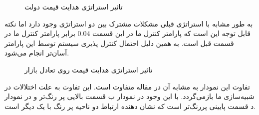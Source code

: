 \documentclass[13pt,onecolumn,a4paper]{article}
\begin{document}
\begin{figure}[H]
	\centering
	\hfil
	
	\medskip
	\hfil
	
	\caption{تاثیر استراتژی هدایت قیمت دولت}
	\label{fig:myfigure}
\end{figure}
به طور مشابه با استراتژی قبلی مشکلات مشترک بین دو استراتژی وجود دارد اما نکته قابل توجه این است که پارامتر کنترل ما در این قسمت $0.04$ برابر پارامتر کنترل ما در قسمت قبل است. به همین دلیل احتمال کنترل پذیری سیستم توسط این پارامتر آسان‌تر انجام می‌شود.

\begin{figure}[H]
	\centering
	\hfil
	
	\medskip
	\hfil
	
	\caption{تاثیر استراتژی هدایت قیمت روی تعادل بازار}
	\label{fig:myfigure}
\end{figure}
	تفاوت این نمودار به مشابه آن در مقاله متفاوت است. این تفاوت به علت اختلالات در شبیه‌سازی ما بازمی‌گردد. با این وجود در نمودار ب قسمت بالایی پر رنگ‌تر و در نمودار د قسمت پایینی پررنگ‌تر است که نشان دهنده ارتباط دو ناحیه پر رنگ با یک دیگر است.
	
\end{document}
